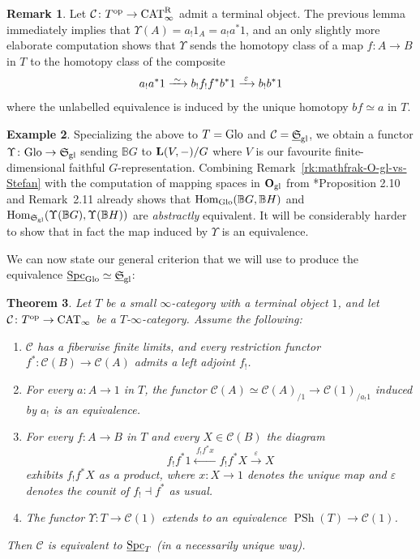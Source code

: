 \documentclass[reqno]{memo-l}
\theoremstyle{mythm}
\newtheorem{thm}{Theorem}[section]
\theoremstyle{definition}
\newtheorem{rk}[thm]{Remark}
\newtheorem{ex}[thm]{Example}
\numberwithin{equation}{section}
\newcommand{\Cc}{{\mathcal{C}}}
\newcommand{\gl}{\textup{gl}}
\renewcommand{\epsilon}{\varepsilon}
\DeclareMathOperator{\Spc}{Spc}
\DeclareMathOperator{\CAT}{CAT}
\renewcommand{\hom}{\textup{hom}}
\DeclareMathOperator{\PSh}{PSh}
\newcommand{\cat}[1]{\textbf{\textup{#1}}}
\newcommand{\op}{{\textup{op}}}
\renewcommand{\hom}{{\textup{Hom}}}
\newcommand{\Glo}{\textup{Glo}}
\newcommand{\BGcat}[1]{\mathbb B{#1}}
\newcommand{\ulhelper}[2]{\underline{\setbox0=\hbox{$#1#2$}\dp0=0.4pt \box0\relax}}
\newcommand{\ul}[1]{{\mathpalette\ulhelper{#1}}\hbox{\rule[-2pt]{0pt}{0pt}}}
\newcommand{\iso}{\xrightarrow{\;\smash{\raisebox{-0.25ex}{\ensuremath{\scriptstyle\sim}}}\;}}
\newcommand{\myS}{{{\mathfrak S\kern-.4pt}}}
\begin{document}
\begin{rk}
    Let $\Cc\colon T^\op\to\CAT^\textup{R}_\infty$ admit a terminal object. The previous lemma immediately implies that $\Upsilon(A)=a_!1_A=a_!a^*1$, and an only slightly more elaborate computation shows that $\Upsilon$ sends the homotopy class of a map $f\colon A\to B$ in $T$ to the homotopy class of the composite
    \[
        a_!a^*1\iso b_!f_!f^*b^*1\xrightarrow{\;\epsilon\;} b_!b^*1
    \]
    where the unlabelled equivalence is induced by the unique homotopy $bf\simeq a$ in $T$.
\end{rk}

\begin{ex}\label{ex:Upsilon-for-Sgl}
    Specializing the above to $T=\Glo$ and $\Cc=\ul\myS_\gl$, we obtain a functor $\Upsilon\colon\Glo\to\myS_\gl$ sending $\BGcat{G}$ to $\cat{L}(V,-)/G$ where $V$ is our favourite finite-dimensional faithful $G$-representation. Combining Remark~\ref{rk:mathfrak-O-gl-vs-Stefan} with the computation of mapping spaces in $\cat{O}_\gl$ from \cite{koerschgen}*{Proposition 2.10 and Remark~2.11} already shows that $\hom_{\Glo}(\BGcat{G},\BGcat{H})$ and $\hom_{\myS_\gl}(\Upsilon(\BGcat{G}),\Upsilon(\BGcat{H}))$ are \emph{abstractly} equivalent. It will be considerably harder to show that in fact the map induced by $\Upsilon$ is an equivalence.
\end{ex}

We can now state our general criterion that we will use to produce the equivalence $\ul\Spc_\Glo\simeq\ul\myS_\gl$:

\begin{thm}\label{thm:criterion-spc-T}
    Let $T$ be a small $\infty$-category with a terminal object $1$, and let $\Cc\colon T^\op\to\CAT_\infty$ be a $T$-$\infty$-category. Assume the following:
    \begin{enumerate}
        \item $\Cc$ has a fiberwise finite limits, and every restriction functor $f^*\colon\Cc(B)\to\Cc(A)$ admits a left adjoint $f_!$.
        \item For every $a\colon A\to 1$ in $T$, the functor $\Cc(A)\simeq\Cc(A)_{/1}\to\Cc(1)_{/a_!1}$ induced by $a_!$ is an equivalence.
        \item For every $f\colon A\to B$ in $T$ and every $X\in\Cc(B)$ the diagram
        \[
            f_!f^*1\xleftarrow{\;f_!f^*x\;}f_!f^*X\xrightarrow{\;\epsilon\;}X
        \]
        exhibits $f_!f^*X$ as a product, where $x\colon X\to 1$ denotes the unique map and $\epsilon$ denotes the counit of $f_!\dashv f^*$ as usual.
        \item The functor $\Upsilon\colon T\to\Cc(1)$ extends to an equivalence $\PSh(T)\to\Cc(1)$.
    \end{enumerate}
    Then $\Cc$ is equivalent to $\ul\Spc_T$ (in a necessarily unique way).
\end{thm}
\end{document}
